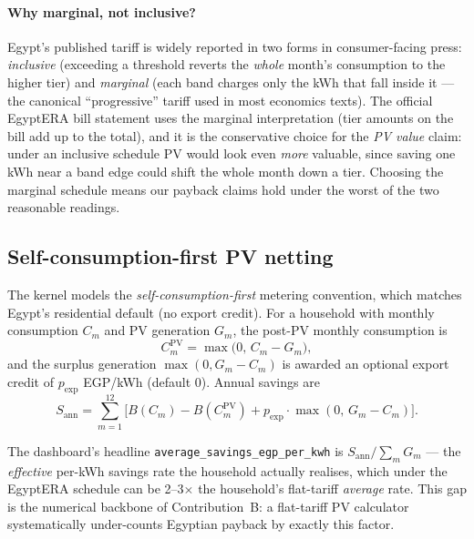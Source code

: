 \paragraph{Why marginal, not inclusive?}
Egypt's published tariff is widely reported in two forms in
consumer-facing press: \emph{inclusive} (exceeding a threshold
reverts the \emph{whole} month's consumption to the higher tier) and
\emph{marginal} (each band charges only the kWh that fall inside it
--- the canonical ``progressive'' tariff used in most economics
texts). The official EgyptERA bill statement uses the marginal
interpretation (tier amounts on the bill add up to the total), and it
is the conservative choice for the \emph{PV value} claim: under an
inclusive schedule PV would look even \emph{more} valuable, since
saving one kWh near a band edge could shift the whole month down a
tier. Choosing the marginal schedule means our payback claims hold
under the worst of the two reasonable readings.

\subsection{Self-consumption-first PV netting}

The kernel models the \emph{self-consumption-first} metering
convention, which matches Egypt's residential default (no export
credit). For a household with monthly consumption $C_m$ and PV
generation $G_m$, the post-PV monthly consumption is
\begin{equation}
C^{\text{PV}}_m = \max\bigl(0,\, C_m - G_m\bigr),
\label{eq:netting}
\end{equation}
and the surplus generation $\max(0, G_m - C_m)$ is awarded an
optional export credit of $p_{\text{exp}}$ EGP/kWh (default 0).
Annual savings are
\begin{equation}
S_{\text{ann}} = \sum_{m=1}^{12}
  \bigl[ B(C_m) - B(C^{\text{PV}}_m)
       + p_{\text{exp}} \cdot \max(0,\, G_m - C_m) \bigr].
\label{eq:savings}
\end{equation}

The dashboard's headline \texttt{average\_savings\_egp\_per\_kwh} is
$S_{\text{ann}} / \sum_m G_m$ --- the \emph{effective} per-kWh
savings rate the household actually realises, which under the
EgyptERA schedule can be 2--3$\times$ the household's flat-tariff
\emph{average} rate. This gap is the numerical backbone of
Contribution~B: a flat-tariff PV calculator systematically
under-counts Egyptian payback by exactly this factor.

